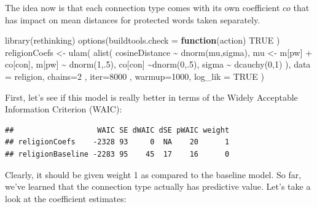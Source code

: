 \documentclass[
  12pt,
]{book}
\newenvironment{Shaded}{\begin{snugshade}}{\end{snugshade}}
\newcommand{\AttributeTok}[1]{\textcolor[rgb]{0.77,0.63,0.00}{#1}}
\newcommand{\ConstantTok}[1]{\textcolor[rgb]{0.00,0.00,0.00}{#1}}
\newcommand{\ControlFlowTok}[1]{\textcolor[rgb]{0.13,0.29,0.53}{\textbf{#1}}}
\newcommand{\DecValTok}[1]{\textcolor[rgb]{0.00,0.00,0.81}{#1}}
\newcommand{\FunctionTok}[1]{\textcolor[rgb]{0.00,0.00,0.00}{#1}}
\newcommand{\NormalTok}[1]{#1}
\newcommand{\OtherTok}[1]{\textcolor[rgb]{0.56,0.35,0.01}{#1}}
\newcommand{\SpecialCharTok}[1]{\textcolor[rgb]{0.00,0.00,0.00}{#1}}
\begin{document}
\noindent The idea now is that each connection type comes with its own coefficient \(co\) that has impact on mean distances for protected words taken separately.

\vspace{1mm}
\footnotesize

\begin{Shaded}
\begin{Highlighting}[]
\FunctionTok{library}\NormalTok{(rethinking)}
\FunctionTok{options}\NormalTok{(}\AttributeTok{buildtools.check =} \ControlFlowTok{function}\NormalTok{(action) }\ConstantTok{TRUE}\NormalTok{ )}
\NormalTok{religionCoefs }\OtherTok{\textless{}{-}} \FunctionTok{ulam}\NormalTok{(}
  \FunctionTok{alist}\NormalTok{(}
\NormalTok{    cosineDistance }\SpecialCharTok{\textasciitilde{}} \FunctionTok{dnorm}\NormalTok{(mu,sigma),}
\NormalTok{    mu }\OtherTok{\textless{}{-}}\NormalTok{ m[pw] }\SpecialCharTok{+}\NormalTok{ co[con],}
\NormalTok{    m[pw] }\SpecialCharTok{\textasciitilde{}} \FunctionTok{dnorm}\NormalTok{(}\DecValTok{1}\NormalTok{,.}\DecValTok{5}\NormalTok{),}
\NormalTok{    co[con] }\SpecialCharTok{\textasciitilde{}}\FunctionTok{dnorm}\NormalTok{(}\DecValTok{0}\NormalTok{,.}\DecValTok{5}\NormalTok{),}
\NormalTok{    sigma }\SpecialCharTok{\textasciitilde{}} \FunctionTok{dcauchy}\NormalTok{(}\DecValTok{0}\NormalTok{,}\DecValTok{1}\NormalTok{)}
\NormalTok{  ),}
  \AttributeTok{data =}\NormalTok{ religion,}
  \AttributeTok{chains=}\DecValTok{2}\NormalTok{ , }\AttributeTok{iter=}\DecValTok{8000}\NormalTok{ , }\AttributeTok{warmup=}\DecValTok{1000}\NormalTok{, }
  \AttributeTok{log\_lik =} \ConstantTok{TRUE}
\NormalTok{)}
\end{Highlighting}
\end{Shaded}

\normalsize

\noindent First, let's see if this model is really better in terms of the Widely Acceptable Information Criterion (WAIC):

\vspace{1mm}
\footnotesize

\begin{verbatim}
##                   WAIC SE dWAIC dSE pWAIC weight
## religionCoefs    -2328 93     0  NA    20      1
## religionBaseline -2283 95    45  17    16      0
\end{verbatim}

\normalsize

Clearly, it should be given weight 1 as compared to the baseline model. So far, we've learned that the connection type actually has predictive value. Let's take a look at the coefficient estimates:
\end{document}
